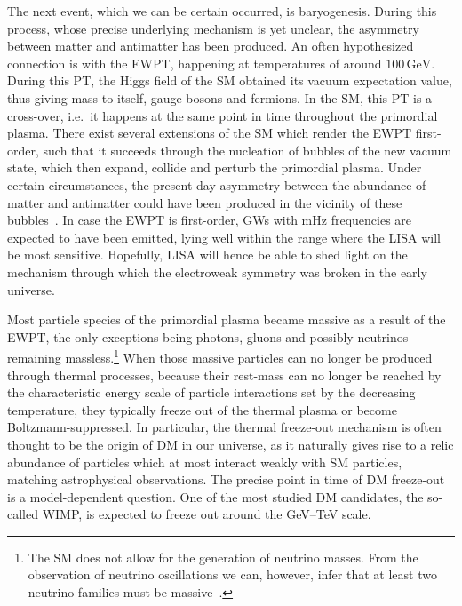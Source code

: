 The next event, which we can be certain occurred, is baryogenesis. During this process, whose precise underlying mechanism is yet unclear, the asymmetry between matter and antimatter has been produced. An often hypothesized connection is with the \ac{EWPT}, happening at temperatures of around $100 \, \text{GeV}$. During this \ac{PT}, the Higgs field of the \ac{SM} obtained its vacuum expectation value, thus giving mass to itself, gauge bosons and fermions. In the \ac{SM}, this \ac{PT} is a cross-over, i.e.~it happens  at the same point in time throughout the primordial plasma. There exist several extensions of the \ac{SM} which render the \ac{EWPT} first-order, such that it succeeds through the nucleation of bubbles of the new vacuum state, which then expand, collide and perturb the primordial plasma. Under certain circumstances, the present-day asymmetry between the abundance of matter and antimatter could have been produced in the vicinity of these bubbles~\cite{Baumann:2022mni}. In case the \ac{EWPT} is first-order, \acp{GW} with $\text{mHz}$ frequencies are expected to have been emitted, lying well within the range where the \acf{LISA} will be most sensitive. Hopefully, \ac{LISA} will hence be able to shed light on the mechanism through which the electroweak symmetry was broken in the early universe.

Most particle species of the primordial plasma became massive as a result of the \ac{EWPT}, the only exceptions being photons, gluons and possibly neutrinos remaining massless.\footnote{The \ac{SM} does not allow for the generation of neutrino masses. From the observation of neutrino oscillations we can, however, infer that at least two neutrino families must be massive~\cite{Baumann:2022mni, ParticleDataGroup:2022pth}.} When those massive particles can no longer be produced through thermal processes, because their rest-mass can no longer be reached by the characteristic energy scale of particle interactions set by the decreasing temperature, they typically freeze out of the thermal plasma or become Boltzmann-suppressed. In particular, the thermal freeze-out mechanism is often thought to be the origin of \ac{DM} in our universe, as it naturally gives rise to a  relic abundance of particles which at most interact  weakly with \ac{SM} particles, matching astrophysical observations. The precise point in time of \ac{DM} freeze-out is a model-dependent question. One of the most studied \ac{DM} candidates, the so-called \ac{WIMP}, is expected to freeze out around the GeV--TeV scale.

